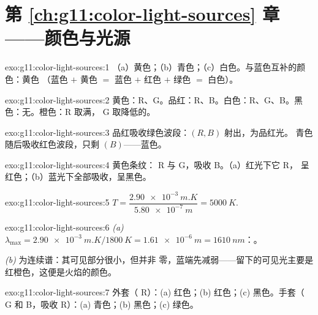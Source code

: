\section*{第 \ref{ch:g11:color-light-sources} 章——颜色与光源}

\begin{solution}{exo:g11:color-light-sources:1}
（a）黄色；（b）青色；（c）白色。与蓝色互补的颜色：黄色
（蓝色 $+$ 黄色 $=$ 蓝色 $+$ 红色 $+$ 绿色 $=$ 白色）。
\end{solution}

\begin{solution}{exo:g11:color-light-sources:2}
黄色：R、G。品红：R、B。白色：R、G、B。黑色：无。橙色：R 取满，
G 取降低的。
\end{solution}

\begin{solution}{exo:g11:color-light-sources:3}
品红吸收绿色波段：$(R, B)$ 射出，为品红光。
青色随后吸收红色波段，只剩 $(B)$——蓝色。
\end{solution}

\begin{solution}{exo:g11:color-light-sources:4}
黄色条纹： R 与 G，吸收 B。（a）红光下它 R，
呈红色；（b）蓝光下全部吸收，呈黑色。
\end{solution}

\begin{solution}{exo:g11:color-light-sources:5}
$T = \dfrac{\qty{2.90e-3}{m.K}}{\qty{5.80e-7}{m}} = \qty{5000}{K}$.
\end{solution}

\begin{solution}{exo:g11:color-light-sources:6}
\emph{(a)} $\lambda_{\max} = \qty{2.90e-3}{m.K}/\qty{1800}{K}
= \qty{1.61e-6}{m} = \qty{1610}{nm}$：。

\emph{(b)} 为连续谱：其可见部分很小，但并非
零，蓝端先减弱——留下的可见光主要是
红橙色，这便是火焰的颜色。
\end{solution}

\begin{solution}{exo:g11:color-light-sources:7}
外套（ R）：(a) 红色；(b) 红色；(c) 黑色。手套（ G 和
B，吸收 R）：(a) 青色；(b) 黑色；(c) 绿色。
\end{solution}

